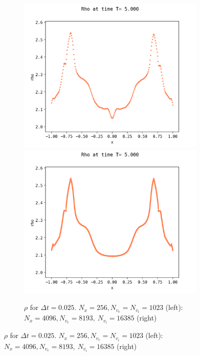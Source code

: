 \documentclass{article}
\numberwithin{equation}{section}
\newcommand{\mysubcaption}[1]{
	\vspace*{5pt}
	\begin{minipage}{0.8\linewidth}
		\begin{center}
			\footnotesize\emph{#1}
		\end{center}
	\end{minipage}
}
\newcommand{\imh}{\textheight} %
\newcommand{\imw}{\textwidth} %
\begin{document}
\begin{figure}
	\centering
	\newcommand{\rootSL}{../code_SL/}
	\newcommand{\rootFD}{../temp_res_DF/}
	\newcommand{\dirSL}{run_comp_long_time_2sp_Nx1000_Nvi2001_Nve2001_Nt100000}
	\newcommand{\dirFD}{run_comp_long_time_2sp_Nx200_Nv400_Nt2500000}
	
	\renewcommand{\imh}{0.24\textheight}
	\renewcommand{\imw}{0.45\linewidth}
	

	\begin{subfigure}{\textwidth}
		\centering
		\includegraphics[height=\imh,width=0.45\linewidth]{images/rhoT5_run5af.png}
		\includegraphics[height=\imh,width=0.45\linewidth]{images/rhoT5_run5h.png}
		\caption{$\rho$ for $\Delta t=0.025$. $N_x=256, N_{v_e}=N_{v_i}=1023$ (left): $N_x=4096  , N_{v_e}=8193,\ N_{v_i}=16385$ (right)}
	\end{subfigure}


\end{figure}
\end{document}
